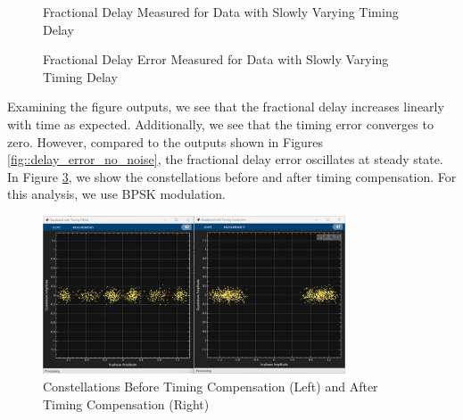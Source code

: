 \documentclass{article}
\begin{document}
\begin{figure}[H]
	\centerline{}
	\caption{Fractional Delay Measured for Data with Slowly Varying Timing Delay}
	\label{fig::fractional_delay_timing_offset}
\end{figure}

\begin{figure}[H]
	\centerline{}
	\caption{Fractional Delay Error Measured for Data with Slowly Varying Timing Delay}
	\label{fig::fractional_delay_error_timing_offset}
\end{figure}

\noindent Examining the figure outputs, we see that the fractional delay increases linearly with time as expected. Additionally, we see that the timing error converges to zero. However, compared to the outputs shown in Figures \ref{fig::delay_error_no_noise}, the fractional delay error oscillates at steady state. In Figure \ref{fig::constellations_with_timing_correction}, we show the constellations before and after timing compensation. For this analysis, we use BPSK modulation.
 
\begin{figure}[H]
	\centerline{\includegraphics[width=0.8\textwidth]{constellations_with_timing_correction.png}}
	\caption{Constellations Before Timing Compensation (Left) and After Timing Compensation (Right)}
	\label{fig::constellations_with_timing_correction}
\end{figure}
\end{document}

